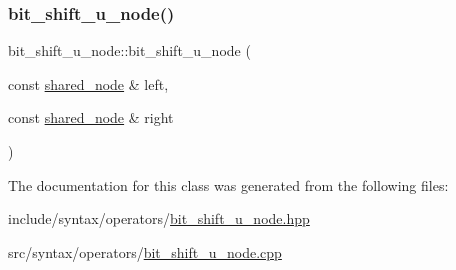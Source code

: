 \subsubsection{\texorpdfstring{bit\+\_\+shift\+\_\+u\+\_\+node()}{bit\_shift\_u\_node()}}
{\footnotesize\ttfamily bit\+\_\+shift\+\_\+u\+\_\+node\+::bit\+\_\+shift\+\_\+u\+\_\+node (\begin{DoxyParamCaption}\item[{const \hyperlink{namespacejawe_a3f307481d921b6cbb50cc8511fc2b544}{shared\+\_\+node} \&}]{left,  }\item[{const \hyperlink{namespacejawe_a3f307481d921b6cbb50cc8511fc2b544}{shared\+\_\+node} \&}]{right }\end{DoxyParamCaption})}



The documentation for this class was generated from the following files\+:\begin{DoxyCompactItemize}
\item 
include/syntax/operators/\hyperlink{bit__shift__u__node_8hpp}{bit\+\_\+shift\+\_\+u\+\_\+node.\+hpp}\item 
src/syntax/operators/\hyperlink{bit__shift__u__node_8cpp}{bit\+\_\+shift\+\_\+u\+\_\+node.\+cpp}\end{DoxyCompactItemize}
